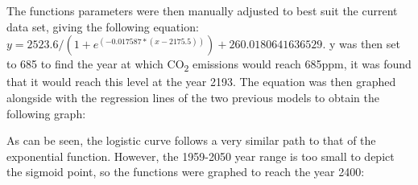\documentclass{mcmthesis}
\begin{document}
    The function\textquotesingle s parameters were then manually adjusted to best suit the current data set, giving the following equation: ${y = 2523.6 / (1 + e^{(-0.017587 * (x - 2175.5))}) + 260.0180641636529}$. {y} was then set to 685 to find the year at which CO\textsubscript{2} emissions would reach 685ppm, it was found that it would reach this level at the year 2193. The equation was then graphed alongside with the regression lines of the two previous models to obtain the following graph:

    \begin{center}
    \end{center}

    As can be seen, the logistic curve follows a very similar path to that of the exponential function. However, the 1959-2050 year range is too small to depict the sigmoid point, so the functions were graphed to reach the year 2400:

    \begin{center}
    \end{center}
\end{document}
